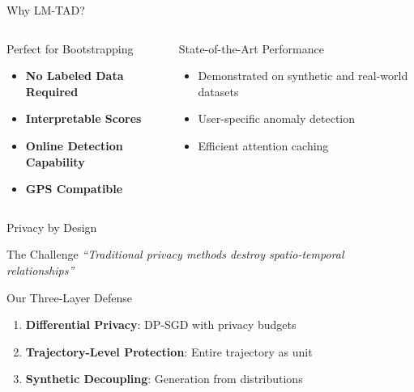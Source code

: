 \documentclass[aspectratio=169,xcolor={dvipsnames}]{beamer}
\begin{document}
\begin{frame}{Why LM-TAD?}
  \begin{columns}
    \begin{column}{0.5\textwidth}
      \begin{block}{Perfect for Bootstrapping}
        \begin{itemize}
          \item \textbf{No Labeled Data Required}
          \item \textbf{Interpretable Scores}
          \item \textbf{Online Detection Capability}
          \item \textbf{GPS Compatible}
        \end{itemize}
      \end{block}
    \end{column}
    \begin{column}{0.5\textwidth}
      \begin{alertblock}{State-of-the-Art Performance}
        \begin{itemize}
          \item Demonstrated on synthetic and real-world datasets
          \item User-specific anomaly detection
          \item Efficient attention caching
        \end{itemize}
      \end{alertblock}
    \end{column}
  \end{columns}
\end{frame}

\begin{frame}{Privacy by Design \cite{buchholzSystematisationKnowledgeTrajectory2024}}
  \begin{alertblock}{The Challenge}
    \centering
    \textit{``Traditional privacy methods destroy spatio-temporal relationships''}
  \end{alertblock}
  
  \vspace{1em}
  \begin{block}{Our Three-Layer Defense}
    \begin{enumerate}
      \item \textbf{Differential Privacy}: DP-SGD with privacy budgets
      \item \textbf{Trajectory-Level Protection}: Entire trajectory as unit
      \item \textbf{Synthetic Decoupling}: Generation from distributions
    \end{enumerate}
  \end{block}
\end{frame}
\end{document}
